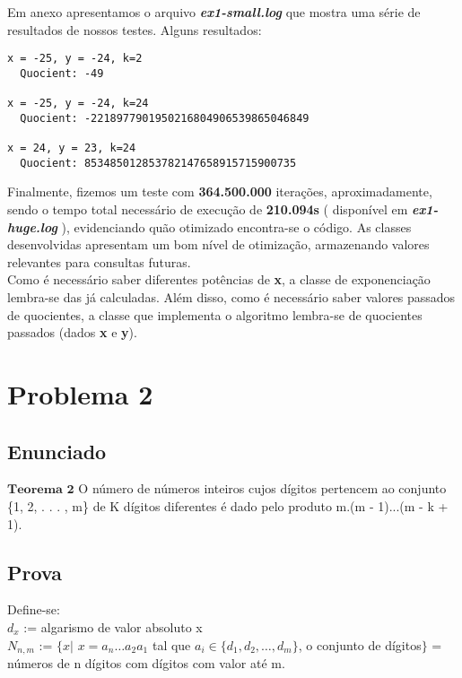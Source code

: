 \documentclass[twoside]{article}
\begin{document}
\begin{multicols}{2}
\indent Em anexo apresentamos o arquivo \textbf{\textit{ex1-small.log}} que mostra uma série de resultados de nossos testes. Alguns resultados:\\

\begin{lstlisting}
x = -25, y = -24, k=2
  Quocient: -49

x = -25, y = -24, k=24
  Quocient: -2218977901950216804906539865046849

x = 24, y = 23, k=24
  Quocient: 853485012853782147658915715900735

\end{lstlisting}

\indent Finalmente, fizemos um teste com \textbf{364.500.000} iterações, aproximadamente, sendo o tempo total necessário de execução de \textbf{210.094s} ( disponível em \textbf{\textit{ex1-huge.log}} ), evidenciando quão otimizado encontra-se o código. As classes desenvolvidas apresentam um bom nível de otimização, armazenando valores relevantes para consultas futuras.\\

\indent Como é necessário saber diferentes potências de \textbf{x}, a classe de exponenciação lembra-se das já calculadas. Além disso, como é necessário saber valores passados de quocientes, a classe que implementa o algoritmo lembra-se de quocientes passados (dados \textbf{x} e \textbf{y}).



\newpage
\section{Problema 2}

\subsection{ Enunciado }
\indent $\mathbf{Teorema}$ $\mathbf{2}$ O número de números inteiros cujos dígitos pertencem ao conjunto \{1, 2, . . . , m\} de
K dígitos diferentes é dado pelo produto m.(m - 1)...(m - k + 1).

\subsection{ Prova }
\indent 

Define-se:\\
$d_x$ := algarismo de valor absoluto x\\
$N_{n,m}$ := $\{ x | $ $x=a_n \dots a_2a_1$ tal que $a_i \in \{d_1,d_2, \dots ,d_m\}$, o conjunto de dígitos$\}$ = números de n dígitos com dígitos com valor até m.\\


\end{multicols}
\end{document}
